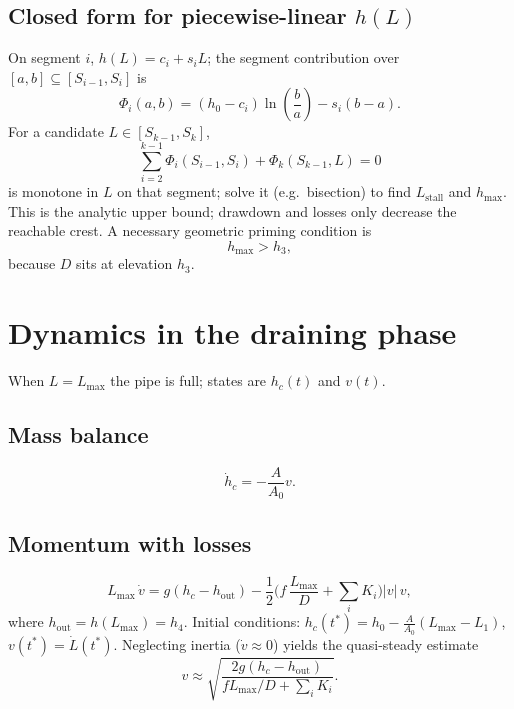 \documentclass[11pt]{article}
\begin{document}
\subsection{Closed form for piecewise-linear $h(L)$}
On segment $i$, $h(L)=c_i+s_i L$; the segment contribution over $[a,b]\subseteq [S_{i-1},S_i]$ is
\begin{equation}
  \Phi_i(a,b) = (h_0-c_i)\ln\!\left(\frac{b}{a}\right) - s_i (b-a).
  \label{eq:Phi}
\end{equation}
For a candidate $L\in [S_{k-1},S_k]$,
\begin{equation}
  \sum_{i=2}^{k-1} \Phi_i(S_{i-1},S_i) + \Phi_k(S_{k-1},L) = 0
  \label{eq:stall-piecewise}
\end{equation}
is monotone in $L$ on that segment; solve it (e.g.\ bisection) to find $L_{\text{stall}}$ and $h_{\max}$. This is the analytic upper bound; drawdown and losses only decrease the reachable crest. A necessary geometric priming condition is
\begin{equation}
  h_{\max} > h_3,
  \label{eq:priming-criterion}
\end{equation}
because $D$ sits at elevation $h_3$.

\section{Dynamics in the draining phase}
\label{sec:drain}
When $L=L_{\max}$ the pipe is full; states are $h_c(t)$ and $v(t)$.

\subsection{Mass balance}
\begin{equation}
  \dot h_c = -\frac{A}{A_0} v.
  \label{eq:drain-mass}
\end{equation}

\subsection{Momentum with losses}
\begin{equation}
  L_{\max}\,\dot v
  = g(h_c - h_{\text{out}})
    - \frac{1}{2}\Big(f\,\frac{L_{\max}}{D} + \sum_i K_i\Big)|v|\,v,
  \label{eq:drain-mom}
\end{equation}
where $h_{\text{out}}=h(L_{\max})=h_4$. Initial conditions: $h_c(t^*)=h_0 - \tfrac{A}{A_0}(L_{\max}-L_1)$, $v(t^*)=\dot L(t^*)$. Neglecting inertia ($\dot v\approx 0$) yields the quasi-steady estimate
\begin{equation}
  v \approx \sqrt{\frac{2g(h_c-h_{\text{out}})}{f L_{\max}/D + \sum_i K_i}}.
  \label{eq:drain-quasi}
\end{equation}
\end{document}
